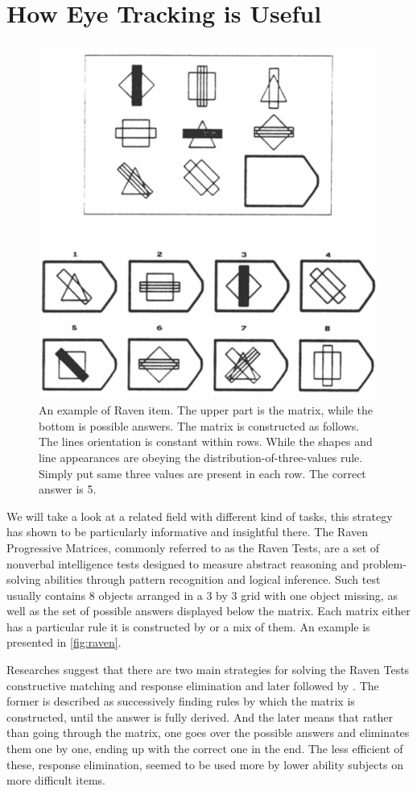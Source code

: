 \section{How Eye Tracking is Useful}
\begin{figure}
    \centering
    \includegraphics[width=0.5\linewidth]{images/raven_carpenter_1990.png}
    \caption{An example of Raven item. The upper part is the matrix, while the bottom is possible answers. The matrix is constructed as follows. The lines orientation is constant within rows. While the shapes and line appearances are obeying the distribution-of-three-values rule. Simply put same three values are present in each row. The correct answer is 5.}
    \label{fig:raven}
\end{figure}
We will take a look at a related field with different kind of tasks, this strategy has shown to be particularly informative and insightful there. 
The Raven Progressive Matrices, commonly referred to as the Raven Tests, are a set of nonverbal intelligence tests designed to measure abstract reasoning and problem-solving abilities through pattern recognition and logical inference. Such test usually contains 8 objects arranged in a 3 by 3 grid with one object missing, as well as the set of possible answers displayed below the matrix. Each matrix either has a particular rule it is constructed by or a mix of them. An example is presented in \autoref{fig:raven}. 

Researches suggest that there are two main strategies for solving the Raven Tests constructive matching and response elimination \citep{Bethel-Fox_1984} and later followed by \cite{Vigneau_2006}. The former is described as successively finding rules by which the matrix is constructed, until the answer is fully derived. And the later means that rather than going through the matrix, one goes over the possible answers and eliminates them one by one, ending up with the correct one in the end. The less efficient of these, response elimination, seemed to be used more by lower ability subjects on more difficult items. 

